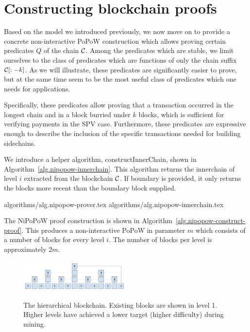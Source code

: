 \section{Constructing blockchain proofs}

Based on the model we introduced previously, we now move on to provide a
concrete non-interactive PoPoW construction which allows proving certain
predicates $Q$ of the chain $\mathcal{C}$. Among the predicates which are stable, we
limit ourselves to the class of predicates which are functions of only the
chain suffix $\mathcal{C}[:-k]$. As we will illustrate, these predicates are
significantly easier to prove, but at the same time seem to be the most useful
class of predicates which one needs for applications.

Specifically, these predicates allow proving that a transaction occurred in the
longest chain and in a block burried under $k$ blocks, which is sufficient for
verifying payments in the SPV case. Furthermore, these predicates are
expressive enough to describe the inclusion of the specific transactions needed
for building sidechains.

We introduce a helper algorithm, constructInnerChain, shown in
Algorithm~\ref{alg.nipopow-innerchain}. This algorithm returns the innerchain
of level $i$ extracted from the blockchain $\mathcal{C}$. If boundary is provided,
it only returns the blocks more recent than the boundary block supplied.

{algorithms/alg.nipopow-prover.tex}
{algorithms/alg.nipopow-innerchain.tex}

The NiPoPoW proof construction is shown in Algorithm~\ref{alg.nipopow-construct-proof}.
This produces a non-interactive PoPoW in parameter $m$ which consists of a
number of blocks for every level $i$. The number of blocks per level is
approximately $2m$.

\begin{figure}[h]
    \caption{The hierarchical blockchain. Existing blocks are shown in level 1.
    Higher levels have achieved a lower target (higher difficulty) during mining.}
    \centering
    \includegraphics[width=0.5\textwidth,keepaspectratio]{figures/hierarchical-ledger.png}
    \label{fig:hierarchy}
\end{figure}

